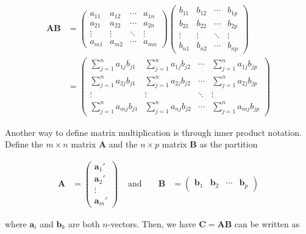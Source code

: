 \documentclass[
]{book}
\theoremstyle{definition}
\theoremstyle{definition}
\theoremstyle{definition}
\theoremstyle{definition}
\theoremstyle{remark}
\begin{document}
\[
\begin{aligned}
\mathbf{A} \mathbf{B} & = \begin{pmatrix} a_{11} & a_{12} & \cdots & a_{1n} \\
a_{21} & a_{22} & \cdots & a_{2n} \\
\vdots & \vdots & \ddots & \vdots \\
a_{m1} & a_{m2} & \cdots & a_{mn}
\end{pmatrix} 
\begin{pmatrix} b_{11} & b_{12} & \cdots & b_{1p} \\
b_{21} & b_{22} & \cdots & b_{2p} \\
\vdots & \vdots & \ddots & \vdots \\
b_{n1} & b_{n2} & \cdots & b_{np}
\end{pmatrix} \\
& = \begin{pmatrix} \sum_{j=1}^n a_{1j} b_{j1} & \sum_{j=1}^n a_{1j} b_{j2} & \cdots & \sum_{j=1}^n a_{1j} b_{jp} \\
\sum_{j=1}^n a_{2j} b_{j1} &\sum_{j=1}^n a_{2j} b_{j2} & \cdots & \sum_{j=1}^n a_{2j} b_{jp} \\
\vdots & \vdots & \ddots & \vdots \\
\sum_{j=1}^n a_{mj} b_{j1} &\sum_{j=1}^n a_{nj} b_{j2} & \cdots & \sum_{j=1}^n a_{mj} b_{jp}
\end{pmatrix} 
\end{aligned}
\label{eq:matrix-multiplication}
\]

Another way to define matrix multiplication is through inner product notation. Define the \(m \times n\) matrix \(\mathbf{A}\) and the \(n \times p\) matrix \(\mathbf{B}\) as the partition

\[
\begin{aligned}
\mathbf{A} & = \begin{pmatrix} \mathbf{a}_{1}' \\
\mathbf{a}_{2}' \\ 
\vdots \\
\mathbf{a}_{m}' \end{pmatrix}
& \mbox{ and } 
&& \mathbf{B} & = \begin{pmatrix} \mathbf{b}_{1} & \mathbf{b}_{2} & \cdots & \mathbf{b}_{p} \end{pmatrix} 
\end{aligned}
\]

where \(\mathbf{a}_i\) and \(\mathbf{b}_k\) are both \(n\)-vectors. Then, we have \(\mathbf{C} = \mathbf{A} \mathbf{B}\) can be written as
\end{document}
